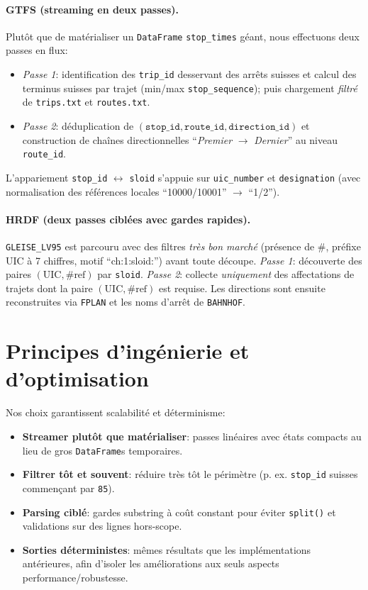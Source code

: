 \paragraph{GTFS (streaming en deux passes).} Plutôt que de matérialiser un \texttt{DataFrame} \texttt{stop\_times} géant, nous effectuons deux passes en flux:
\begin{itemize}
  \item \textit{Passe 1}: identification des \texttt{trip\_id} desservant des arrêts suisses et calcul des terminus suisses par trajet (min/max \texttt{stop\_sequence}); puis chargement \emph{filtré} de \texttt{trips.txt} et \texttt{routes.txt}.
  \item \textit{Passe 2}: déduplication de \((\texttt{stop\_id},\texttt{route\_id},\texttt{direction\_id})\) et construction de chaînes directionnelles \enquote{\textit{Premier} $\to$ \textit{Dernier}} au niveau \texttt{route\_id}.
\end{itemize}
L’appariement \texttt{stop\_id} \(\leftrightarrow\) \texttt{sloid} s’appuie sur \texttt{uic\_number} et \texttt{designation} (avec normalisation des références locales \enquote{10000/10001} \(\to\) \enquote{1/2}).

\paragraph{HRDF (deux passes ciblées avec gardes rapides).} \texttt{GLEISE\_LV95} est parcouru avec des filtres \emph{très bon marché} (présence de \#, préfixe UIC à 7 chiffres, motif \enquote{ch:1:sloid:}) avant toute découpe. \emph{Passe 1}: découverte des paires \((\text{UIC}, \#\text{ref})\) par \texttt{sloid}. \emph{Passe 2}: collecte \emph{uniquement} des affectations de trajets dont la paire \((\text{UIC}, \#\text{ref})\) est requise. Les directions sont ensuite reconstruites via \texttt{FPLAN} et les noms d’arrêt de \texttt{BAHNHOF}.

\section{Principes d’ingénierie et d’optimisation}
Nos choix garantissent scalabilité et déterminisme:
\begin{itemize}
  \item \textbf{Streamer plutôt que matérialiser}: passes linéaires avec états compacts au lieu de gros \texttt{DataFrame}s temporaires.
  \item \textbf{Filtrer tôt et souvent}: réduire très tôt le périmètre (p. ex. \texttt{stop\_id} suisses commençant par \texttt{85}).
  \item \textbf{Parsing ciblé}: gardes substring à coût constant pour éviter \texttt{split()} et validations sur des lignes hors-scope.
  \item \textbf{Sorties déterministes}: mêmes résultats que les implémentations antérieures, afin d’isoler les améliorations aux seuls aspects performance/robustesse.
\end{itemize}

